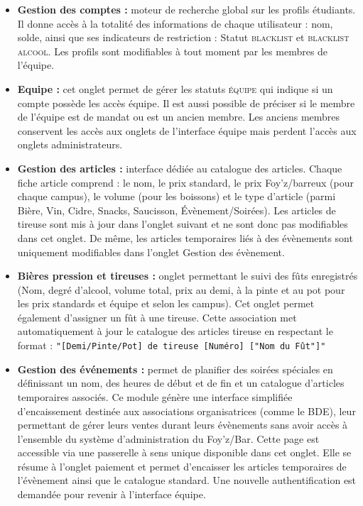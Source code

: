 \documentclass[a4paper,11pt]{article}
\begin{document}
\begin{itemize}
    \item \textbf{Gestion des comptes :} moteur de recherche global sur les profils étudiants. Il donne accès à la totalité des informations de chaque utilisateur : nom, solde, ainsi que ses indicateurs de restriction : Statut \textsc{blacklist} et \textsc{blacklist alcool}. Les profils sont modifiables à tout moment par les membres de l'équipe.
    \item \textbf{Equipe :} cet onglet permet de gérer les statuts \textsc{équipe} qui indique si un compte possède les accès équipe. Il est aussi possible de préciser si le membre de l'équipe est de mandat ou est un ancien membre. Les anciens membres conservent les accès aux onglets de l'interface équipe mais perdent l'accès aux onglets administrateurs.
    \item \textbf{Gestion des articles :} interface dédiée au catalogue des articles. Chaque fiche article comprend : le nom, le prix standard, le prix Foy'z/barreux (pour chaque campus), le volume (pour les boissons) et le type d'article (parmi Bière, Vin, Cidre, Snacks, Saucisson, Évènement/Soirées). Les articles de tireuse sont mis à jour dans l'onglet suivant et ne sont donc pas modifiables dans cet onglet. De même, les articles temporaires liés à des évènements sont uniquement modifiables dans l'onglet Gestion des évènement.
    \item \textbf{Bières pression et tireuses :} onglet permettant le suivi des fûts enregistrés (Nom, degré d'alcool, volume total, prix au demi, à la pinte et au pot pour les prix standards et équipe et selon les campus). Cet onglet permet également d'assigner un fût à une tireuse. Cette association met automatiquement à jour le catalogue des articles tireuse en respectant le format : \texttt{"[Demi/Pinte/Pot] de tireuse [Numéro] ["Nom du Fût"]"}
    \item \textbf{Gestion des événements :} permet de planifier des soirées spéciales en définissant un nom, des heures de début et de fin et un catalogue d'articles temporaires associés. Ce module génère une interface simplifiée d'encaissement destinée aux associations organisatrices (comme le BDE), leur permettant de gérer leurs ventes durant leurs évènements sans avoir accès à l'ensemble du système d'administration du Foy'z/Bar. Cette page est accessible via une passerelle à sens unique disponible dans cet onglet. Elle se résume à l'onglet paiement et permet d'encaisser les articles temporaires de l'évènement ainsi que le catalogue standard. Une nouvelle authentification est demandée pour revenir à l'interface équipe.

\end{itemize}
\end{document}
